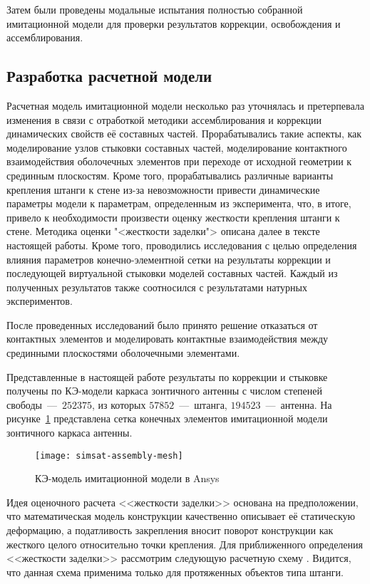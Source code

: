 Затем были проведены модальные испытания полностью собранной имитационной модели для проверки результатов коррекции, освобождения и ассемблирования. 

\subsection{Разработка расчетной модели} \label{struct:simsat-model}

Расчетная модель имитационной модели несколько раз уточнялась и претерпевала изменения в связи с отработкой методики ассемблирования и коррекции динамических свойств её составных частей. Прорабатывались такие аспекты, как моделирование узлов стыковки составных частей, моделирование контактного взаимодействия оболочечных элементов при переходе от исходной геометрии к срединным плоскостям. Кроме того, прорабатывались различные варианты крепления штанги к стене из-за невозможности привести динамические параметры модели к параметрам, определенным из эксперимента, что, в итоге, привело к необходимости произвести оценку жесткости крепления штанги к стене. Методика оценки "<жесткости заделки"> описана далее в тексте настоящей работы. Кроме того, проводились исследования с целью определения влияния параметров конечно-элементной сетки на результаты коррекции и последующей виртуальной стыковки моделей составных частей. Каждый из полученных результатов также соотносился с результатами натурных экспериментов. 

После проведенных исследований было принято решение отказаться от контактных элементов и моделировать контактные взаимодействия между срединными плоскостями оболочечными элементами. 

Представленные в настоящей работе результаты по коррекции и стыковке получены по КЭ-модели каркаса зонтичного  антенны с числом степеней свободы~---~$ 252375 $, из которых $ 57852 $~---~штанга, $ 194523 $~---~антенна. На рисунке~\ref{fig:simsat-assembly-mesh} представлена сетка конечных элементов имитационной модели зонтичного каркаса антенны.

\begin{figure}[!htb]
	\centerfloat
	\texttt{[image: simsat-assembly-mesh]}
	\caption{КЭ-модель имитационной модели в Ansys} \label{fig:simsat-assembly-mesh}
\end{figure}

Идея оценочного расчета <<жесткости заделки>> основана на предположении, что математическая модель конструкции качественно описывает её статическую деформацию, а податливость закрепления вносит поворот конструкции как жесткого целого относительно точки крепления. Для приближенного определения <<жесткости заделки>> рассмотрим следующую расчетную схему . Видится, что данная схема применима только для протяженных объектов типа штанги.


